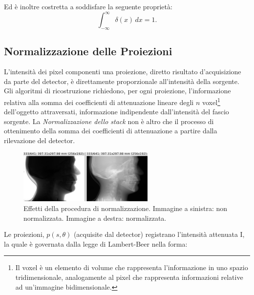 \documentclass[a4paper,12pt, doubleside]{report}
\begin{document}
                    Ed è inoltre costretta a soddisfare la seguente proprietà:
                    \begin{equation}
                        \int_{-\infty}^\infty \delta(x) \, dx = 1.
                    \end{equation}
            
            \subsection{Normalizzazione delle Proiezioni}
                \label{sec:normalizzazione}
                \par
                    L'intensità dei pixel componenti una proiezione, diretto risultato d'acquisizione da parte del detector, è direttamente proporzionale all'intensità della sorgente. Gli algoritmi di ricostruzione richiedono, per ogni proiezione, l'informazione relativa alla somma dei coefficienti di attenuazione lineare degli $n$ voxel\footnote{Il voxel è un elemento di volume che rappresenta l'informazione in uno spazio tridimensionale, analogamente al pixel che rappresenta informazioni relative ad un'immagine bidimensionale.} dell'oggetto attraversati, informazione indipendente dall'intensità del fascio sorgente. La \textit{Normalizzazione dello stack} non è altro che il processo di ottenimento della somma dei coefficienti di attenuazione a partire dalla rilevazione del detector.
              
                    \begin{figure}[h]
                        \centering
                        \includegraphics[width=0.6\textwidth]{normalization}
                        \caption{Effetti della procedura di normalizzazione. Immagine a sinistra: non normalizzata. Immagine a destra: normalizzata.}
                        \label{fig:skull-phantom}
                    \end{figure}
                    
                    Le proiezioni, $p(s,\theta)$ (acquisite dal detector) registrano l'intensità attenuata I, la quale è governata dalla legge di Lambert-Beer \cite{lambert-beer} nella forma:
                    
\end{document}
